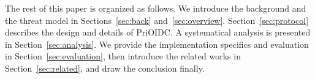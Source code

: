 The rest of this paper is organized as follows. We introduce the background and the threat model in Sections~\ref{sec:back} and~\ref{sec:overview}. Section~\ref{sec:protocol} describes the design  and details of PriOIDC. A systematical analysis is presented in Section~\ref{sec:analysis}. We provide the implementation specifics and evaluation in Section~\ref{sec:evaluation}, then introduce the related works in Section~\ref{sec:related}, and draw the conclusion finally. 




